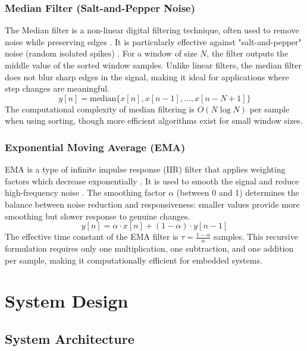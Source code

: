 \subsubsection{Median Filter (Salt-and-Pepper Noise)}
The Median filter is a non-linear digital filtering technique, often used to remove noise while preserving edges \cite{median_filter}. It is particularly effective against "salt-and-pepper" noise (random isolated spikes) \cite{gonzalez}. For a window of size $N$, the filter outputs the middle value of the sorted window samples. Unlike linear filters, the median filter does not blur sharp edges in the signal, making it ideal for applications where step changes are meaningful.
\begin{equation}
y[n] = \text{median}\{x[n], x[n-1], \dots, x[n-N+1]\}
\end{equation}
The computational complexity of median filtering is $O(N \log N)$ per sample when using sorting, though more efficient algorithms exist for small window sizes.

\subsubsection{Exponential Moving Average (EMA)}
EMA is a type of infinite impulse response (IIR) filter that applies weighting factors which decrease exponentially \cite{iir_filters}. It is used to smooth the signal and reduce high-frequency noise \cite{smith_dsp}. The smoothing factor $\alpha$ (between 0 and 1) determines the balance between noise reduction and responsiveness: smaller values provide more smoothing but slower response to genuine changes.
\begin{equation}
y[n] = \alpha \cdot x[n] + (1 - \alpha) \cdot y[n-1]
\end{equation}
The effective time constant of the EMA filter is $\tau = \frac{1-\alpha}{\alpha}$ samples. This recursive formulation requires only one multiplication, one subtraction, and one addition per sample, making it computationally efficient for embedded systems.

\section{System Design}

\subsection{System Architecture}

